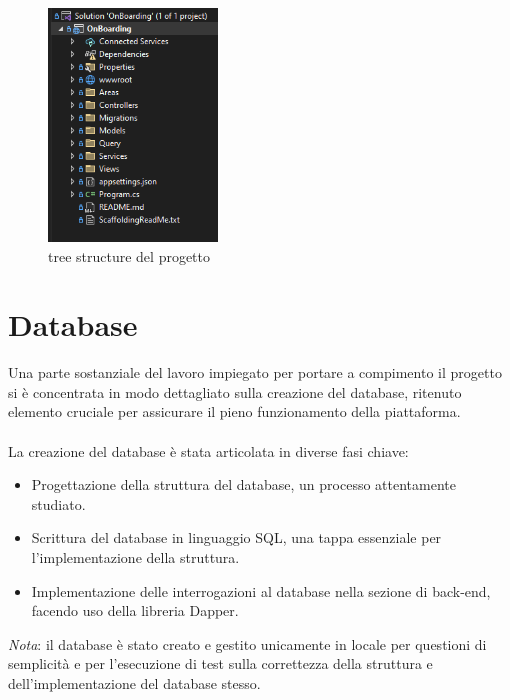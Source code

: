 %
\begin{figure}[ht]
	\centering
	\includegraphics[width=0.4\textwidth]{img/treeStructure.png}
	\caption{tree structure del progetto}
	\label{fig:one}
\end{figure}
%
\section{Database}\label{sec:cap_sec_subsec}
Una parte sostanziale del lavoro impiegato per portare a compimento il
progetto si è concentrata in modo dettagliato sulla creazione del database,
ritenuto elemento cruciale per assicurare il pieno funzionamento della
piattaforma. 
\\ \\ 
La creazione del database è stata articolata in diverse fasi chiave:
\begin{itemize}
	\item Progettazione della struttura del database, un processo attentamente studiato.
	\item Scrittura del database in linguaggio SQL, una tappa essenziale per l'implementazione della struttura.
	\item Implementazione delle interrogazioni al database nella sezione di back-end,
	      facendo uso della libreria Dapper.
\end{itemize}
\textit{Nota}: il database è stato creato e gestito unicamente in locale per questioni di semplicità e per
l'esecuzione di test sulla correttezza della struttura e dell'implementazione del database stesso.
%
